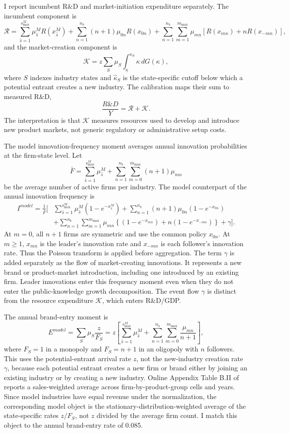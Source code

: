 \documentclass[12pt]{article}
\begin{document}
I report incumbent R\&D and market-initiation expenditure separately. The incumbent component is
\[
\mathcal R
=\sum_{\hat s=1}^{s_{\max}^M}\mu^M_{\hat s}R(x^M_{\hat s})
+\sum_{n=1}^{n_b}(n+1)\mu_{0n}R(x_{0n})
+\sum_{n=1}^{n_b}\sum_{m=1}^{m_{\max}}\mu_{mn}
\left[R(x_{mn})+nR(x_{-mn})\right],
\]
and the market-creation component is
\[
\mathcal K
=z\sum_S\mu_S\int_{\underline\kappa}^{\hat\kappa_S}\kappa\,dG(\kappa),
\]
where \(S\) indexes industry states and \(\hat\kappa_S\) is the state-specific cutoff below which a potential entrant creates a new industry. The calibration maps their sum to measured R\&D,
\[
\frac{R\&D}{Y}=\mathcal R+\mathcal K.
\]
The interpretation is that \(\mathcal K\) measures resources used to develop and introduce new product markets, not generic regulatory or administrative setup costs.

The model innovation-frequency moment averages annual innovation probabilities at the firm-state level. Let
\[
\bar F
=\sum_{\hat s=1}^{s_{\max}^M}\mu^M_{\hat s}
+\sum_{n=1}^{n_b}\sum_{m=0}^{m_{\max}}(n+1)\mu_{mn}
\]
be the average number of active firms per industry. The model counterpart of the annual innovation frequency is
\[
\begin{split}
I^{model}=\frac{1}{\bar F}\Bigg[&
\sum_{\hat s=1}^{s_{\max}^M}\mu^M_{\hat s}
\left(1-e^{-x^M_{\hat s}}\right)
+\sum_{n=1}^{n_b}(n+1)\mu_{0n}
\left(1-e^{-x_{0n}}\right)\\
&+\sum_{n=1}^{n_b}\sum_{m=1}^{m_{\max}}\mu_{mn}
\left\{\left(1-e^{-x_{mn}}\right)
+n\left(1-e^{-x_{-mn}}\right)\right\}
+\gamma\Bigg].
\end{split}
\]
At \(m=0\), all \(n+1\) firms are symmetric and use the common policy \(x_{0n}\). At \(m\geq1\), \(x_{mn}\) is the leader's innovation rate and \(x_{-mn}\) is each follower's innovation rate. Thus the Poisson transform is applied before aggregation. The term \(\gamma\) is added separately as the flow of market-creating innovations. It represents a new brand or product-market introduction, including one introduced by an existing firm. Leader innovations enter this frequency moment even when they do not enter the public-knowledge growth decomposition. The event flow \(\gamma\) is distinct from the resource expenditure \(\mathcal K\), which enters R\&D/GDP.

The annual brand-entry moment is
\[
E^{model}
=\sum_S\mu_S\frac{z}{F_S}
=z\left[
\sum_{\hat s=1}^{s_{\max}^M}\mu^M_{\hat s}
+\sum_{n=1}^{n_b}\sum_{m=0}^{m_{\max}}\frac{\mu_{mn}}{n+1}
\right],
\]
where \(F_S=1\) in a monopoly and \(F_S=n+1\) in an oligopoly with \(n\) followers. This uses the potential-entrant arrival rate \(z\), not the new-industry creation rate \(\gamma\), because each potential entrant creates a new firm or brand either by joining an existing industry or by creating a new industry. Online Appendix Table B.II of \citet{ArgenteLM24} reports a sales-weighted average across firm-by-product-group cells and years. Since model industries have equal revenue under the normalization, the corresponding model object is the stationary-distribution-weighted average of the state-specific rates \(z/F_S\), not \(z\) divided by the average firm count. I match this object to the annual brand-entry rate of 0.085.
\end{document}

